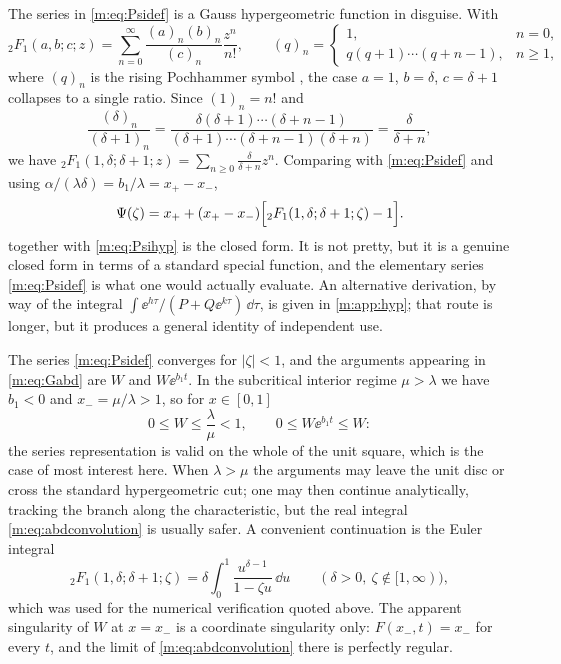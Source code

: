 The series in \cref{m:eq:Psidef} is a Gauss hypergeometric function in disguise.
With
\begin{equation}
\label{m:eq:2F1def}
{}_2F_1(a,b;c;z) = \sum_{n=0}^{\infty}\frac{(a)_n(b)_n}{(c)_n}\frac{z^n}{n!},
\qquad
(q)_n = \begin{cases}1, & n=0,\\ q(q+1)\cdots(q+n-1), & n\ge1,\end{cases}
\end{equation}
where $(q)_n$ is the rising Pochhammer symbol \cite{Olver2010}, the case $a=1$,
$b=\delta$, $c=\delta+1$ collapses to a single ratio. Since $(1)_n=n!$ and
\begin{equation}
\label{m:eq:pochcancel}
\frac{(\delta)_n}{(\delta+1)_n}
= \frac{\delta(\delta+1)\cdots(\delta+n-1)}{(\delta+1)\cdots(\delta+n-1)(\delta+n)}
= \frac{\delta}{\delta+n},
\end{equation}
we have ${}_2F_1(1,\delta;\delta+1;z) = \sum_{n\ge0}\frac{\delta}{\delta+n}z^n$.
Comparing with \cref{m:eq:Psidef} and using
$\alpha/(\lambda\delta) = b_1/\lambda = x_+-x_-$,
\begin{equation}
\label{m:eq:Psihyp}
\Psi(\zeta) = x_+ + (x_+-x_-)\Bigl[{}_2F_1(1,\delta;\delta+1;\zeta)-1\Bigr] .
\end{equation}
 together with \cref{m:eq:Psihyp} is the closed form. It is not
pretty, but it is a genuine closed form in terms of a standard special function,
and the elementary series \cref{m:eq:Psidef} is what one would actually evaluate. An
alternative derivation, by way of the integral
$\int\ee^{h\tau}/(P+Q\ee^{k\tau})\,\dd\tau$, is given in \cref{m:app:hyp}; that
route is longer, but it produces a general identity of independent use.

\begin{remark}
\label{m:rem:domain}
The series \cref{m:eq:Psidef} converges for $|\zeta|<1$, and the arguments appearing
in \cref{m:eq:Gabd} are $W$ and $W\ee^{b_1t}$. In the subcritical interior regime
$\mu>\lambda$ we have $b_1<0$ and $x_-=\mu/\lambda>1$, so for $x\in[0,1]$
\begin{equation*}
0\le W\le\frac{\lambda}{\mu}<1,
\qquad
0\le W\ee^{b_1t}\le W :
\end{equation*}
the series representation is valid on the whole of the unit square, which is the
case of most interest here. When $\lambda>\mu$ the arguments may leave the unit disc
or cross the standard hypergeometric cut; one may then continue analytically,
tracking the branch along the characteristic, but the real integral
\cref{m:eq:abdconvolution} is usually safer. A convenient continuation is the Euler
integral
\begin{equation*}
{}_2F_1(1,\delta;\delta+1;\zeta) = \delta\int_0^1\frac{u^{\delta-1}}{1-\zeta u}\,\dd u
\qquad(\delta>0,\ \zeta\notin[1,\infty)),
\end{equation*}
which was used for the numerical verification quoted above. The apparent
singularity of $W$ at $x=x_-$ is a coordinate singularity only: $F(x_-,t)=x_-$ for
every $t$, and the limit of \cref{m:eq:abdconvolution} there is perfectly regular.
\end{remark}

